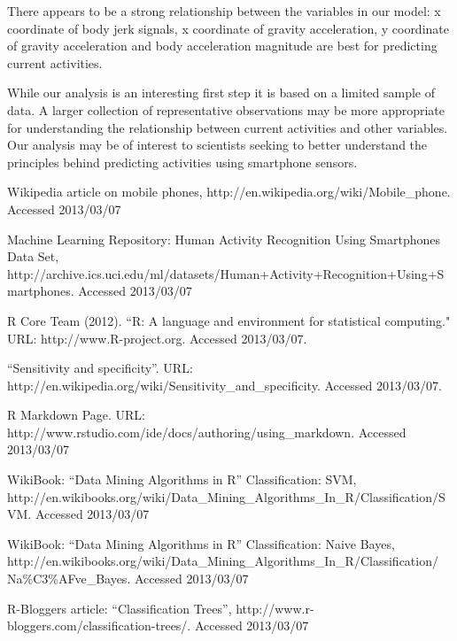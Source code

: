 \documentclass[a4paper,12pt]{extarticle}
\begin{document}
There appears to be a strong relationship between the variables in our model: x coordinate of body jerk signals, x coordinate of gravity acceleration, y coordinate of gravity acceleration and body acceleration magnitude are best for predicting current activities.

While our analysis is an interesting first step it is based on a limited sample of data. A larger collection of representative observations may be more appropriate for understanding the relationship between current activities and other variables. Our analysis may be of interest to scientists seeking to better understand the principles behind predicting activities using smartphone sensors.

\newpage


\begin{thebibliography}{9}

  Wikipedia article on mobile phones, http://en.wikipedia.org/wiki/Mobile\_phone. Accessed 2013/03/07

  Machine Learning Repository: Human Activity Recognition Using Smartphones Data Set, http://archive.ics.uci.edu/ml/datasets/Human+Activity+Recognition+Using+Smartphones. Accessed 2013/03/07

  R Core Team (2012). ``R: A language and environment for statistical computing." URL: http://www.R-project.org. Accessed 2013/03/07.

  ``Sensitivity and specificity''. URL: http://en.wikipedia.org/wiki/Sensitivity\_and\_specificity. Accessed 2013/03/07.

  R Markdown Page. URL: http://www.rstudio.com/ide/docs/authoring/using\_markdown. Accessed 2013/03/07

  WikiBook: ``Data Mining Algorithms in R'' Classification: SVM, http://en.wikibooks.org/wiki/Data\_Mining\_Algorithms\_In\_R/Classification/SVM. Accessed 2013/03/07

  WikiBook: ``Data Mining Algorithms in R'' Classification: Naive Bayes,  http://en.wikibooks.org/wiki/Data\_Mining\_Algorithms\_In\_R/Classification/ \\ Na\%C3\%AFve\_Bayes. Accessed 2013/03/07

  R-Bloggers article: ``Classification Trees'', http://www.r-bloggers.com/classification-trees/. Accessed 2013/03/07

\end{thebibliography}
\end{document}
